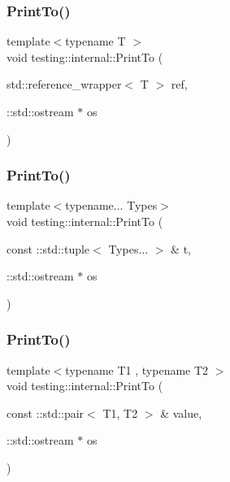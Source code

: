 \mbox{\label{namespacetesting_1_1internal_a5587d09db034bc597870ae86bd8c01f8}} 
\subsubsection{\texorpdfstring{Print\+To()}{PrintTo()}\hspace{0.1cm}{\footnotesize\ttfamily [17/19]}}
{\footnotesize\ttfamily template$<$typename T $>$ \\
void testing\+::internal\+::\+Print\+To (\begin{DoxyParamCaption}\item[{std\+::reference\+\_\+wrapper$<$ T $>$}]{ref,  }\item[{\+::std\+::ostream $\ast$}]{os }\end{DoxyParamCaption})}

\mbox{\label{namespacetesting_1_1internal_a5628347cba9a345f56087fdb70930fc8}} 
\subsubsection{\texorpdfstring{Print\+To()}{PrintTo()}\hspace{0.1cm}{\footnotesize\ttfamily [18/19]}}
{\footnotesize\ttfamily template$<$typename... Types$>$ \\
void testing\+::internal\+::\+Print\+To (\begin{DoxyParamCaption}\item[{const \+::std\+::tuple$<$ Types... $>$ \&}]{t,  }\item[{\+::std\+::ostream $\ast$}]{os }\end{DoxyParamCaption})}

\mbox{\label{namespacetesting_1_1internal_af2c33928facbf2edf7af564278724d98}} 
\subsubsection{\texorpdfstring{Print\+To()}{PrintTo()}\hspace{0.1cm}{\footnotesize\ttfamily [19/19]}}
{\footnotesize\ttfamily template$<$typename T1 , typename T2 $>$ \\
void testing\+::internal\+::\+Print\+To (\begin{DoxyParamCaption}\item[{const \+::std\+::pair$<$ T1, T2 $>$ \&}]{value,  }\item[{\+::std\+::ostream $\ast$}]{os }\end{DoxyParamCaption})}

